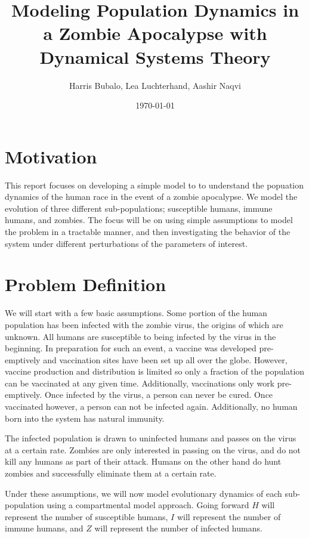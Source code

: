 \documentclass[
	12pt
]{article}
\title{Modeling Population Dynamics in a Zombie Apocalypse with Dynamical Systems Theory} %
\date{\today}
\author{Harris Bubalo, Lea Luchterhand, Aashir Naqvi}
\begin{document}
\maketitle

\section{Motivation}

This report focuses on developing a simple model to to understand the popuation dynamics of the human race in the event of a zombie apocalypse. We model the evolution of three different sub-populations; susceptible humans, immune humans, and zombies. The focus will be on using simple assumptions to model the problem in a tractable manner, and then investigating the behavior of the system under different perturbations of the parameters of interest.

 \section{Problem Definition}

We will start with a few basic assumptions. Some portion of the human population has been infected with the zombie virus, the origins of which are unknown. All humans are susceptible to being infected by the virus in the beginning. In preparation for such an event, a vaccine was developed pre-emptively and vaccination sites have been set up all over the globe. However, vaccine production and distribution is limited so only a fraction of the population can be vaccinated at any given time. Additionally, vaccinations only work pre-emptively. Once infected by the virus, a person can never be cured. Once vaccinated however, a person can not be infected again. Additionally, no human born into the system has natural immunity.

The infected population is drawn to uninfected humans and passes on the virus at a certain rate. Zombies are only interested in passing on the virus, and do not kill any humans as part of their attack. Humans on the other hand do hunt zombies and successfully eliminate them at a certain rate. 

Under these assumptions, we will now model evolutionary dynamics of each sub-population using a compartmental model approach. Going forward $H$ will represent the number of susceptible humans, $I$ will represent the number of immune humans, and $Z$ will represent the number of infected humans.
\end{document}
